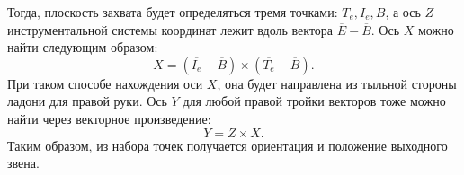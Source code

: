\documentclass[14pt, a4paper]{extarticle}
\begin{document}
Тогда, плоскость захвата будет определяться тремя точками: $T_e, I_e, B$, а ось
$Z$ инструментальной системы координат лежит вдоль вектора $\overline{E} -
\overline{B}$. Ось $X$ можно найти следующим образом:
\begin{equation}
  X = (\overline{I_e} - \overline{B}) \times (\overline{T_e} - \overline{B}).
  \label{eqn:instumental_x_axis}
\end{equation}
При таком способе нахождения оси $X$, она будет направлена из тыльной стороны
ладони для правой руки.
Ось $Y$ для любой правой тройки векторов тоже можно найти через векторное произведение:
\begin{equation}
  Y = Z \times X.
  \label{eqn:instumental_y_axis}
\end{equation}
Таким образом, из набора точек получается ориентация и положение выходного
звена.
\end{document}
